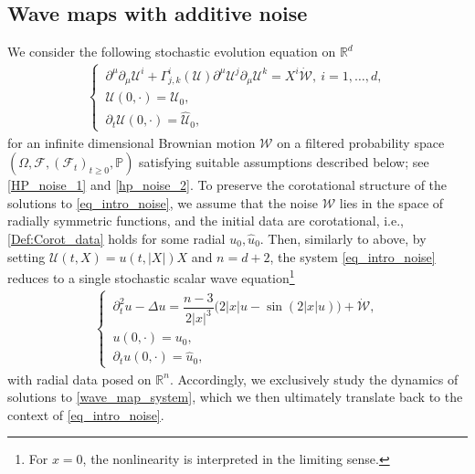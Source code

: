 \documentclass[12pt,reqno]{amsart}
\theoremstyle{plain}
\theoremstyle{remark}
\theoremstyle{plain}
\theoremstyle{definition}
\numberwithin{equation}{section}
\numberwithin{equation}{section}
\def\R{{\mathbb R}}
\begin{document}
	\subsection{Wave maps with additive noise}
	We consider the following stochastic evolution equation on $\R^d$
	\begin{align}\label{eq_intro_noise}
		\begin{cases}
			\,\partial^{\mu}\partial_{\mu} \mathcal{U}^i+\Gamma^i_{j,k}(\mathcal{U})\partial^{\mu}\mathcal{U}^j\partial_{\mu}\mathcal{U}^k=X^i\dot{{\mathcal{W}}},\ i=1,\dots,d,\\
			\,\mathcal{U}(0,\cdot)=\mathcal{U}_0,\\
			\,\partial_t \mathcal{U}(0,\cdot)=\hat{\mathcal{U}}_{0},
		\end{cases}
	\end{align}
	for an infinite dimensional Brownian motion $\mathcal{W}$ on a filtered probability space  $(\Omega,\mathcal{F},(\mathcal{F}_t)_{t\geq 0},\mathbb{P})$ satisfying suitable assumptions described below; see \autoref{HP_noise_1} and \autoref{hp_noise_2}. To preserve the corotational structure of the solutions to \eqref{eq_intro_noise}, we assume that the noise $\mathcal{W}$  lies in the space of radially symmetric functions, and the initial data are corotational, i.e., \eqref{Def:Corot_data} holds for some radial $u_0, \hat{u}_0$. Then, similarly to above, by setting $ \mathcal{U}(t,X)=u(t,\lvert X\rvert)X$ and $n=d+2$, the system \eqref{eq_intro_noise} reduces to a single stochastic scalar wave equation\footnote{For $x=0$, the nonlinearity is interpreted in the limiting sense.}
	\begin{align}\label{wave_map_system}
		\begin{cases}
			\,\partial_{t}^2 u-\Delta u  =\dfrac{n-3}{2\lvert x\rvert^3}\big(2\lvert x\rvert u-\sin (2\lvert x\rvert u)\big)+\dot{\mathcal{W}},\\
			\,u(0,\cdot)= u_0,\\
			\,\partial_t u(0,\cdot)=\hat{u}_{0},
		\end{cases}
	\end{align}
	with radial data posed on $\R^n.$ Accordingly, we exclusively study the dynamics of solutions to \eqref{wave_map_system}, which we then ultimately translate back to the context of \eqref{eq_intro_noise}. %
	
\end{document}
